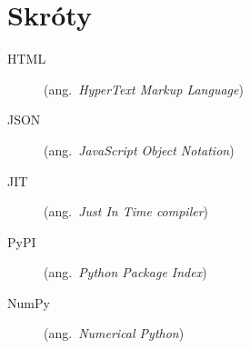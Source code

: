 \chapter*{Skróty}\mbox{}
\label{sec:skroty}
\noindent
\begin{description}
  \item [HTML]    (ang.\ \emph{HyperText Markup Language})
  \item [JSON]    (ang.\ \emph{JavaScript Object Notation})
  \item [JIT]     (ang.\ \emph{Just In Time compiler})
  \item [PyPI]    (ang.\ \emph{Python Package Index})
  \item [NumPy] (ang.\ \emph{Numerical Python})
\end{description}
